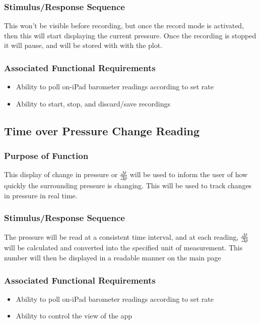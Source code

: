 \documentclass[onecolumn, draftclsnofoot,10pt, compsoc]{IEEEtran}
\begin{document}
\subsubsection{Stimulus/Response Sequence}
This won't be visible before recording, but once the record mode is activated, then this will start displaying the current pressure.
Once the recording is stopped it will pause, and will be stored with with the plot.
\subsubsection{Associated Functional Requirements}
\begin{itemize}
\item Ability to poll on-iPad barometer readings according to set rate
\item Ability to start, stop, and discard/save recordings
\end{itemize}

\subsection{Time over Pressure Change Reading}
\subsubsection{Purpose of Function}
This display of change in pressure or $\frac{\Delta t}{\Delta p}$ will be used to inform the user of how quickly the surrounding pressure is changing. This will be used to track changes in pressure in real time.
\subsubsection{Stimulus/Response Sequence}
The pressure will be read at a consistent time interval, and at each reading, $\frac{\Delta t}{\Delta p}$ will be calculated and converted into the specified unit of measurement. This number will then be displayed in a readable manner on the main page
\subsubsection{Associated Functional Requirements}
\begin{itemize}
\item Ability to poll on-iPad barometer readings according to set rate
\item Ability to control the view of the app
\end{itemize}
\end{document}
